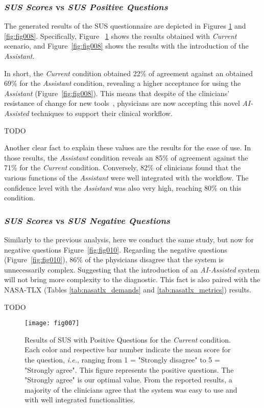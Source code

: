 \subsubsection{{\it SUS Scores} vs {\it SUS Positive Questions}}

The generated results of the SUS questionnaire are depicted in Figures \ref{fig:fig007} and \ref{fig:fig008}.
Specifically, Figure ~\ref{fig:fig007} shows the results obtained with
{\it Current} scenario, and Figure~\ref{fig:fig008} shows the results with the introduction of the {\it Assistant}.

In short, the {\it Current} condition obtained 22\% of agreement against an obtained 69\% for the {\it Assistant} condition, revealing a higher acceptance for using the {\it Assistant} (Figure~\ref{fig:fig008}).
This means that despite of the clinicians' resistance of change for new tools~\cite{Calisto:2017:TTM:3132272.3134111, gagnon2014electronic}, physicians are now accepting this novel {\it AI-Assisted} techniques to support their clinical workflow.

TODO

Another clear fact to explain these values are the results for the ease of use.
In those results, the {\it Assistant} condition reveals an 85\% of agreement against the 71\% for the {\it Current} condition.
Conversely, 82\% of clinicians found that the various functions of the {\it Assistant} were well integrated with the workflow.
The confidence level with the {\it Assistant} was also very high, reaching 80\% on this condition.

\subsubsection{{\it SUS Scores} vs {\it SUS Negative Questions}}

Similarly to the previous analysis, here we conduct the same study, but now for negative questions Figure~\ref{fig:fig010}.
Regarding the negative questions (Figure~\ref{fig:fig010}), 86\% of the physicians disagree that the system is unnecessarily complex.
Suggesting that the introduction of an {\it AI-Assisted} system will not bring more complexity to the diagnostic.
This fact is also paired with the NASA-TLX (Tables \ref{tab:nasatlx_demands} and \ref{tab:nasatlx_metrics}) results.

TODO

\begin{figure}[htbp]
\centering
\texttt{[image: fig007]}
\caption{Results of SUS with Positive Questions for the {\it Current} condition. Each color and respective bar number indicate the mean score for the question, {\it i.e.}, ranging from 1 = "Strongly disagree" to 5 = "Strongly agree". This figure represents the positive questions. The "Strongly agree" is our optimal value. From the reported results, a majority of the clinicians agree that the system was easy to use and with well integrated functionalities.}
\label{fig:fig007}
\end{figure}

